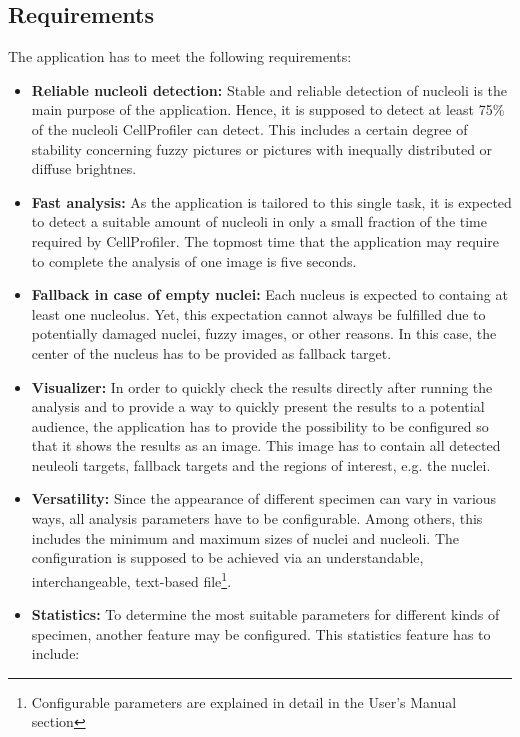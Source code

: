 \documentclass[a4paper, 11pt]{article}
\begin{document}
\subsection{Requirements}
The application has to meet the following requirements:
\begin{itemize}
  \item \textbf{Reliable nucleoli detection:} Stable and reliable detection of
  nucleoli is the main purpose of the application. Hence, it is supposed to
  detect at least 75\% of the nucleoli CellProfiler can detect. This includes
  a certain degree of stability concerning fuzzy pictures or pictures with
  inequally distributed or diffuse brightnes.
  \item \textbf{Fast analysis:} As the application is tailored to this single
  task, it is expected to detect a suitable amount of nucleoli in only a small
  fraction of the time required by CellProfiler. The topmost time that the
  application may require to complete the analysis of one image is five seconds.
  \item \textbf{Fallback in case of empty nuclei:} Each nucleus is expected to
  containg at least one nucleolus. Yet, this expectation cannot always be
  fulfilled due to potentially damaged nuclei, fuzzy images, or other reasons.
  In this case, the center of the nucleus has to be provided as fallback target.
  \item \textbf{Visualizer:} In order to quickly check the results directly
  after running the analysis and to provide a way to quickly present the results
  to a potential audience, the application has to provide the possibility to be
  configured so that it shows the results as an image. This image has to contain
  all detected neuleoli targets, fallback targets and the regions of interest,
  e.g. the nuclei.
  \item \textbf{Versatility:} Since the appearance of different specimen can
  vary in various ways, all analysis parameters have to be configurable. Among
  others, this includes the minimum and maximum sizes of nuclei and nucleoli.
  The configuration is supposed to be achieved via an understandable,
  interchangeable, text-based file\footnote{Configurable parameters are
  explained in detail in the User's Manual section}.
  \item \textbf{Statistics:} To determine the most suitable parameters for
  different kinds of specimen, another feature may be configured. This
  statistics feature has to include:
  \begin{itemize}

\end{itemize}
\end{itemize}
\end{document}
